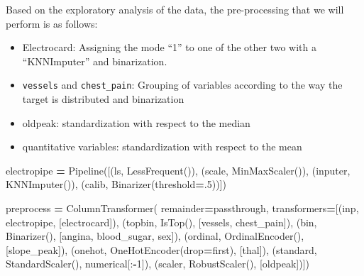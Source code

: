 \documentclass[
]{article}
\newenvironment{Shaded}{\begin{snugshade}}{\end{snugshade}}
\newcommand{\DecValTok}[1]{\textcolor[rgb]{0.00,0.00,0.81}{#1}}
\newcommand{\FloatTok}[1]{\textcolor[rgb]{0.00,0.00,0.81}{#1}}
\newcommand{\NormalTok}[1]{#1}
\newcommand{\OperatorTok}[1]{\textcolor[rgb]{0.81,0.36,0.00}{\textbf{#1}}}
\newcommand{\StringTok}[1]{\textcolor[rgb]{0.31,0.60,0.02}{#1}}
\providecommand{\tightlist}{%
  \setlength{\itemsep}{0pt}\setlength{\parskip}{0pt}}
\begin{document}
Based on the exploratory analysis of the data, the pre-processing that
we will perform is as follows:

\begin{itemize}
\tightlist
\item
  Electrocard: Assigning the mode ``1'' to one of the other two with a
  ``KNNImputer'' and binarization.
\item
  \texttt{vessels} and \texttt{chest\_pain}: Grouping of variables
  according to the way the target is distributed and binarization
\item
  oldpeak: standardization with respect to the median
\item
  quantitative variables: standardization with respect to the mean
\end{itemize}

\begin{Shaded}
\begin{Highlighting}[]
\NormalTok{electropipe }\OperatorTok{=}\NormalTok{ Pipeline([(}\StringTok{\textquotesingle{}ls\textquotesingle{}}\NormalTok{, LessFrequent()), (}\StringTok{\textquotesingle{}scale\textquotesingle{}}\NormalTok{, MinMaxScaler()),}
\NormalTok{                        (}\StringTok{\textquotesingle{}inputer\textquotesingle{}}\NormalTok{, KNNImputer()),}
\NormalTok{                        (}\StringTok{\textquotesingle{}calib\textquotesingle{}}\NormalTok{, Binarizer(threshold}\OperatorTok{=}\FloatTok{.5}\NormalTok{))])}

\NormalTok{preprocess }\OperatorTok{=}\NormalTok{ ColumnTransformer(}
\NormalTok{    remainder}\OperatorTok{=}\StringTok{\textquotesingle{}passthrough\textquotesingle{}}\NormalTok{,}
\NormalTok{    transformers}\OperatorTok{=}\NormalTok{[(}\StringTok{\textquotesingle{}inp\textquotesingle{}}\NormalTok{, electropipe, [}\StringTok{\textquotesingle{}electrocard\textquotesingle{}}\NormalTok{]),}
\NormalTok{                  (}\StringTok{\textquotesingle{}topbin\textquotesingle{}}\NormalTok{, IsTop(), [}\StringTok{\textquotesingle{}vessels\textquotesingle{}}\NormalTok{, }\StringTok{\textquotesingle{}chest\_pain\textquotesingle{}}\NormalTok{]),}
\NormalTok{                  (}\StringTok{\textquotesingle{}bin\textquotesingle{}}\NormalTok{, Binarizer(), [}\StringTok{\textquotesingle{}angina\textquotesingle{}}\NormalTok{, }\StringTok{\textquotesingle{}blood\_sugar\textquotesingle{}}\NormalTok{, }\StringTok{\textquotesingle{}sex\textquotesingle{}}\NormalTok{]),}
\NormalTok{                  (}\StringTok{\textquotesingle{}ordinal\textquotesingle{}}\NormalTok{, OrdinalEncoder(), [}\StringTok{\textquotesingle{}slope\_peak\textquotesingle{}}\NormalTok{]),}
\NormalTok{                  (}\StringTok{\textquotesingle{}onehot\textquotesingle{}}\NormalTok{, OneHotEncoder(drop}\OperatorTok{=}\StringTok{\textquotesingle{}first\textquotesingle{}}\NormalTok{), [}\StringTok{\textquotesingle{}thal\textquotesingle{}}\NormalTok{]),}
\NormalTok{                  (}\StringTok{\textquotesingle{}standard\textquotesingle{}}\NormalTok{, StandardScaler(), numerical[:}\OperatorTok{{-}}\DecValTok{1}\NormalTok{]),}
\NormalTok{                  (}\StringTok{\textquotesingle{}scaler\textquotesingle{}}\NormalTok{, RobustScaler(), [}\StringTok{\textquotesingle{}oldpeak\textquotesingle{}}\NormalTok{])])}


\end{Highlighting}
\end{Shaded}
\end{document}
